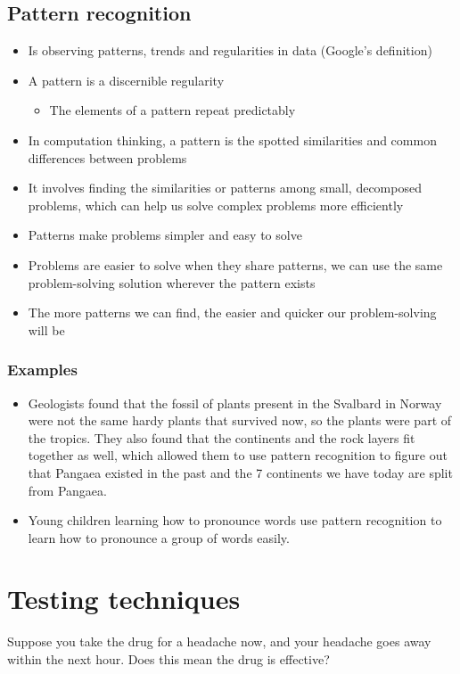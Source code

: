 \documentclass[11pt]{article}
\begin{document}
\subsection{Pattern recognition}
\label{sec:org8040fd8}
\begin{itemize}
\item Is observing patterns, trends and regularities in data (Google's definition)
\item A pattern is a discernible regularity
\begin{itemize}
\item The elements of a pattern repeat predictably
\end{itemize}
\item In computation thinking, a pattern is the spotted similarities and common differences between problems
\item It involves finding the similarities or patterns among small, decomposed problems, which can help us solve complex problems more efficiently
\item Patterns make problems simpler and easy to solve
\item Problems are easier to solve when they share patterns, we can use the same problem-solving solution wherever the pattern exists
\item The more patterns we can find, the easier and quicker our problem-solving will be
\end{itemize}

\subsubsection{Examples}
\label{sec:org99186b9}
\begin{itemize}
\item Geologists found that the fossil of plants present in the Svalbard in Norway were not the same hardy plants that survived now, so the plants were part of the tropics. They also found that the continents and the rock layers fit together as well, which allowed them to use pattern recognition to figure out that Pangaea existed in the past and the 7 continents we have today are split from Pangaea.
\item Young children learning how to pronounce words use pattern recognition to learn how to pronounce a group of words easily.
\end{itemize}


\section{Testing techniques}
\label{sec:org03eacdb}
Suppose you take the drug for a headache now, and your headache goes away within the next hour. Does this mean the drug is effective?
\end{document}
